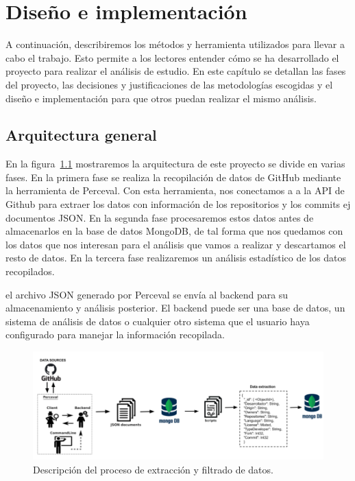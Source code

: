 \documentclass[a4paper, 12pt]{book}
\begin{document}

\cleardoublepage
\chapter{Diseño e implementación}
\label{chap:diseño}

A continuación, describiremos los métodos y herramienta utilizados para llevar a cabo el trabajo. 
Esto permite a los lectores entender cómo se ha desarrollado el proyecto para realizar el análisis de estudio.
En este capítulo se detallan las fases del proyecto, las decisiones y justificaciones de las metodologías escogidas y el diseño e implementación para que otros puedan realizar el mismo análisis.

\section{Arquitectura general} 
\label{sec:arquitectura}

En la figura~\ref{fig:arquitectura} mostraremos la arquitectura de este proyecto se divide en varias fases. 
En la primera fase se realiza la recopilación de datos de GitHub mediante la herramienta de Perceval. 
Con esta herramienta, nos conectamos a a la API de Github para extraer los datos con información de los repositorios y los commits ej documentos JSON.
En la segunda fase procesaremos estos datos antes de almacenarlos en la base de datos MongoDB, de tal forma que nos quedamos con los datos que nos interesan para el análisis que vamos a realizar y descartamos el resto de datos.
En la tercera fase realizaremos un análisis estadístico de los datos recopilados. 

el archivo JSON generado por Perceval se envía al backend para su almacenamiento y análisis posterior. El backend puede ser una base de datos, un sistema de análisis de datos o cualquier otro sistema que el usuario haya configurado para manejar la información recopilada.
\begin{figure}
  \centering
  \includegraphics[width=16cm, keepaspectratio]{img/Arquitectura_general.png}
  \caption{Descripción del proceso de extracción y filtrado de datos.}\label{fig:arquitectura}
\end{figure}
\end{document}
